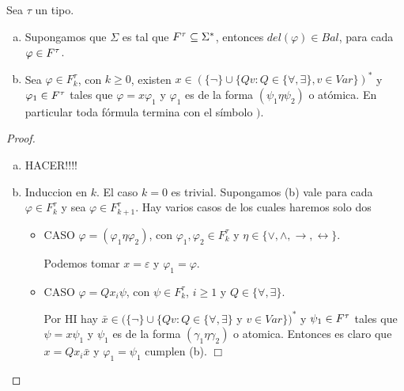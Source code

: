   \begin{lemma} \label{lemma_37}
    \PN Sea $\tau$ un tipo.
    \begin{enumerate}[a)]
      \item Supongamos que $\Sigma$ es tal que $F^{\tau} \subseteq \Sigma^{\ast}$, entonces $del(\varphi) \in Bal$, para cada
        $\varphi \in F^{\tau}$.
      \item Sea $\varphi \in F_{k}^{\tau}$, con $k \geq 0$, existen $x \in (\{\lnot\} \cup \{Qv: Q \in \{\forall,
        \exists\}, v \in Var\})^{\ast}$ y $\varphi_{1} \in F^{\tau}$ tales que $\varphi = x \varphi_{1}$ y
        $\varphi_{1}$ es de la forma $(\psi_{1} \eta \psi_{2})$ o atómica. En particular toda fórmula termina con el
        símbolo $)$.
    \end{enumerate}
  \end{lemma}
  \begin{proof}
    \begin{enumerate}[a)]
      \item HACER!!!!
      \item Induccion en $k$. El caso $k=0$ es trivial. Supongamos (b) vale para cada $\varphi \in F_{k}^{\tau }$ y sea $\varphi \in F_{k+1}^{\tau }$. Hay varios casos de los cuales haremos solo dos
        \begin{itemize}
          \item CASO $\varphi =(\varphi_{1}\eta \varphi_{2})$, con $\varphi_{1},\varphi_{2}\in F_{k}^{\tau }$ y $\eta \in \{\vee ,\wedge ,\rightarrow ,\leftrightarrow \}$.

      Podemos tomar $x=\varepsilon $ y $\varphi_{1}=\varphi $.

          \item CASO $\varphi =Qx_{i}\psi $, con $\psi \in F_{k}^{\tau }$, $i\geq 1$ y $Q\in \{\forall ,\exists \}$.

      Por HI hay $\bar{x}\in (\{\lnot \}\cup \{Qv:Q\in \{\forall ,\exists \}$ y $v\in Var\})^{\ast }$ y $\psi_{1}\in F^{\tau}$ tales que $ \psi =x\psi_{1}$ y $\psi_{1}$ es de la forma $(\gamma_{1}\eta \gamma_{2}) $ o atomica. Entonces es claro que $x=Qx_{i}\bar{x}$ y $\varphi_{1}=\psi_{1}$ cumplen (b). $\Box$
      \end{itemize}
    \end{enumerate}
  \end{proof}

